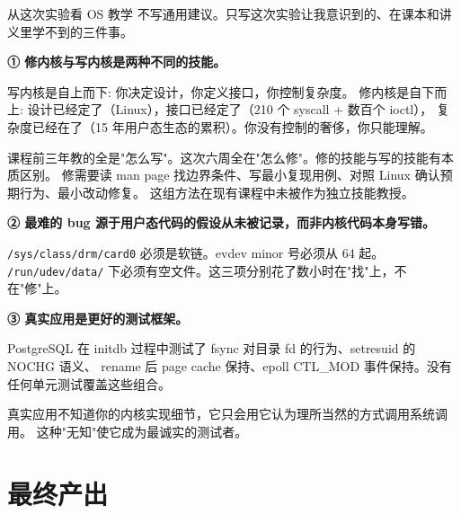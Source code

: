 \documentclass[aspectratio=169,10pt]{ctexbeamer}
\begin{document}
\begin{frame}[shrink=15]{从这次实验看 OS 教学}
不写通用建议。只写这次实验让我意识到的、在课本和讲义里学不到的三件事。

\vspace{1mm}
\textbf{① 修内核与写内核是两种不同的技能。}

写内核是自上而下: 你决定设计，你定义接口，你控制复杂度。
修内核是自下而上: 设计已经定了（Linux），接口已经定了（210 个 syscall + 数百个 ioctl），
复杂度已经在了（15 年用户态生态的累积）。你没有控制的奢侈，你只能理解。

课程前三年教的全是"怎么写"。这次六周全在"怎么修"。修的技能与写的技能有本质区别。
修需要读 man page 找边界条件、写最小复现用例、对照 Linux 确认预期行为、最小改动修复。
这组方法在现有课程中未被作为独立技能教授。

\vspace{1mm}
\textbf{② 最难的 bug 源于用户态代码的假设从未被记录，而非内核代码本身写错。}

\texttt{/sys/class/drm/card0} 必须是软链。evdev minor 号必须从 64 起。
\texttt{/run/udev/data/} 下必须有空文件。这三项分别花了数小时在"找"上，不在"修"上。

\vspace{1mm}
\textbf{③ 真实应用是更好的测试框架。}

PostgreSQL 在 initdb 过程中测试了 fsync 对目录 fd 的行为、setresuid 的 NOCHG 语义、
rename 后 page cache 保持、epoll CTL\_MOD 事件保持。没有任何单元测试覆盖这些组合。

真实应用不知道你的内核实现细节，它只会用它认为理所当然的方式调用系统调用。
这种"无知"使它成为最诚实的测试者。
\end{frame}


\section{最终产出}
\end{document}
